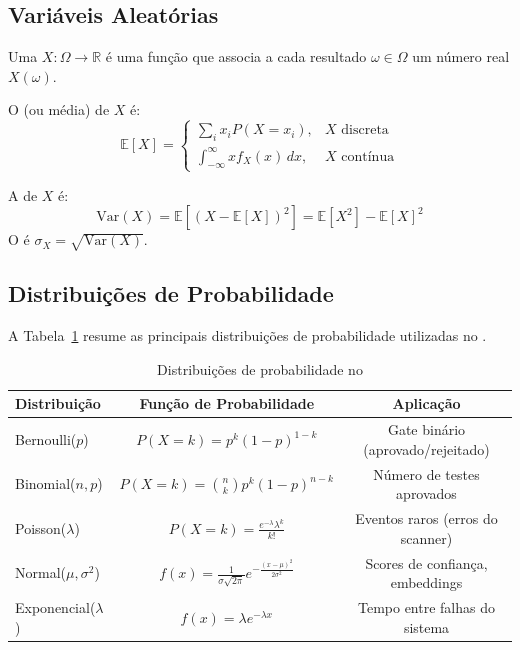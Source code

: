 \subsection{Variáveis Aleatórias}

\begin{definicao}
    Uma  $X: \Omega \to \mathbb{R}$ é uma
    função que associa a cada resultado $\omega \in \Omega$ um número real
    $X(\omega)$.
\end{definicao}

\begin{definicao}
    O  (ou média) de $X$ é:
    \[
    \mathbb{E}[X] = \begin{cases}
        \sum_i x_i P(X = x_i), & X \text{ discreta} \\[4pt]
        \int_{-\infty}^{\infty} x f_X(x) \, dx, & X \text{ contínua}
    \end{cases}
    \]
\end{definicao}

\begin{definicao}[Variância]
    A  de $X$ é:
    \[
    \text{Var}(X) = \mathbb{E}[(X - \mathbb{E}[X])^2] =
    \mathbb{E}[X^2] - \mathbb{E}[X]^2
    \]
    O  é $\sigma_X = \sqrt{\text{Var}(X)}$.
\end{definicao}

\subsection{Distribuições de Probabilidade}

A Tabela~\ref{tab:distribuicoes} resume as principais distribuições de
probabilidade utilizadas no \opencodeeco{}.

\begin{table}[htb]
    \centering
    \caption{Distribuições de probabilidade no \opencodeeco{}}
    \label{tab:distribuicoes}
    \begin{tabular}{lcc}
        \toprule
        \textbf{Distribuição} & \textbf{Função de Probabilidade} &
        \textbf{Aplicação} \\
        \midrule
        Bernoulli($p$) & $P(X = k) = p^k(1-p)^{1-k}$ &
        Gate binário (aprovado/rejeitado) \\
        Binomial($n, p$) & $P(X = k) = \binom{n}{k}p^k(1-p)^{n-k}$ &
        Número de testes aprovados \\
        Poisson($\lambda$) & $P(X = k) = \frac{e^{-\lambda}\lambda^k}{k!}$ &
        Eventos raros (erros do scanner) \\
        Normal($\mu, \sigma^2$) & $f(x) = \frac{1}{\sigma\sqrt{2\pi}}
        e^{-\frac{(x-\mu)^2}{2\sigma^2}}$ &
        Scores de confiança, embeddings \\
        Exponencial($\lambda$) & $f(x) = \lambda e^{-\lambda x}$ &
        Tempo entre falhas do sistema \\
        \bottomrule
    \end{tabular}
\end{table}

